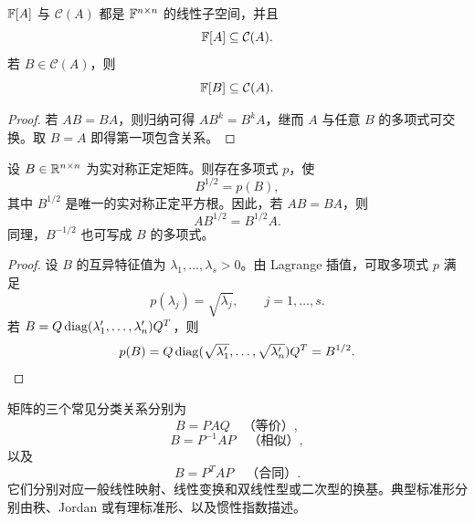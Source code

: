 \begin{proposition}
$\mathbb F[A]$ 与 $\mathcal C(A)$ 都是 $\mathbb F^{n\times n}$ 的线性子空间，并且
\begin{equation}
 \mathbb F[A]\subseteq\mathcal C(A).
\end{equation}
若 $B\in\mathcal C(A)$，则
\begin{equation}
 \mathbb F[B]\subseteq\mathcal C(A).
\end{equation}
\end{proposition}

\begin{proof}
若 $AB=BA$，则归纳可得 $AB^k=B^kA$，继而 $A$ 与任意 $B$ 的多项式可交换。取 $B=A$ 即得第一项包含关系。
\end{proof}

\begin{proposition}[正定平方根是多项式]
设 $B\in\mathbb R^{n\times n}$ 为实对称正定矩阵。则存在多项式 $p$，使
\begin{equation}
 B^{1/2}=p(B),
\end{equation}
其中 $B^{1/2}$ 是唯一的实对称正定平方根。因此，若 $AB=BA$，则
\begin{equation}
 AB^{1/2}=B^{1/2}A.
\end{equation}
同理，$B^{-1/2}$ 也可写成 $B$ 的多项式。
\end{proposition}

\begin{proof}
设 $B$ 的互异特征值为 $\lambda_1,\ldots,\lambda_s>0$。由 Lagrange 插值，可取多项式 $p$ 满足
\begin{equation}
 p(\lambda_j)=\sqrt{\lambda_j},
 \qquad j=1,\ldots,s.
\end{equation}
若 $B=Q\operatorname{diag}(\lambda_1',\ldots,\lambda_n')Q^T$，则
\begin{equation}
 p(B)=Q\operatorname{diag}(\sqrt{\lambda_1'},\ldots,\sqrt{\lambda_n'})Q^T=B^{1/2}.
\end{equation}
\end{proof}

\begin{remark}
矩阵的三个常见分类关系分别为
\begin{equation}
 B=PAQ\quad\text{（等价）},
\end{equation}
\begin{equation}
 B=P^{-1}AP\quad\text{（相似）},
\end{equation}
以及
\begin{equation}
 B=P^TAP\quad\text{（合同）}.
\end{equation}
它们分别对应一般线性映射、线性变换和双线性型或二次型的换基。典型标准形分别由秩、Jordan 或有理标准形、以及惯性指数描述。
\end{remark}

